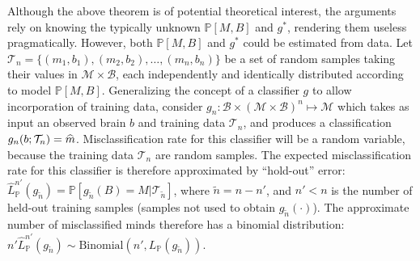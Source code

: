 \documentclass{article}
\newcommand{\mB}{\mathcal{B}}
\newcommand{\mM}{\mathcal{M}}
\newcommand{\PP}{\mathbb{P}}           %
\newcommand{\EE}{\mathbb{E}}           %
\providecommand{\mc}[1]{\mathcal{#1}}
\providecommand{\mh}[1]{\widehat{#1}}
\providecommand{\mt}[1]{\widetilde{#1}}
\newcommand{\hL}{\widehat{L}}
\providecommand{\tr}[1]{\textcolor{black}{#1}}
\begin{document}
Although the above theorem is of potential theoretical interest, the arguments rely on knowing the typically unknown $\PP[M,B]$ and $g^*$, rendering them useless pragmatically.  However, both $\PP[M,B]$ and $g^*$ could be estimated from data.  Let $\mc{T}_n=\{(m_1,b_1), (m_2,b_2), \ldots, (m_n,b_n)\}$ be a set of random samples taking their values in $\mc{M} \times \mc{B}$, each independently and identically distributed according to model $\PP[M,B]$.  Generalizing the concept of a classifier $g$ to allow incorporation of training data, consider $g_n:\mB \times (\mc{M} \times \mc{B})^n \mapsto \mM$ which takes as input an observed brain  $b$ and training data $\mc{T}_n$, and produces a classification $g_n(b;\tr{\mc{T}_n})=\mh{m}$.  Misclassification rate for this classifier will be a random variable, because the training data $\mc{T}_n$ are random samples.  The expected misclassification rate for this classifier is therefore approximated by ``hold-out'' error:
$\hL^{n'}_{\PP}(g_{\mt{n}}) = \PP[g_{\mt{n}}(B)=M | \mc{T}_{\mt{n}}]$,
where $\mt{n}=n-n'$, and $n'<n$ is the number of held-out training samples (samples not used to obtain $g_{\mt{n}}(\cdot)$).
The approximate  number of misclassified minds
therefore
has a binomial distribution:  $n' \hL^{n'}_{\PP}(g_{\mt{n}}) \sim \text{Binomial}(n',L_{\PP}(g_{\mt{n}}))$. %
\end{document}
